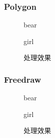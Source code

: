 \documentclass[14pt]{scrartcl} %
\begin{document}
	\pagebreak
	\subsubsection{Polygon}
	
	\begin{figure}[h] %
		\begin{minipage}[t]{0.5\linewidth}
			\centering
			\caption{bear}
		\end{minipage}%
		\begin{minipage}[t]{0.5\linewidth}
			\centering
			\caption{girl}
		\end{minipage}
	\end{figure}
	
	\begin{figure}[h] %
		\centering
		\caption{处理效果}
	\end{figure}
	
	\pagebreak
	
	\subsubsection{Freedraw}
	
	\begin{figure}[h] %
		\begin{minipage}[t]{0.5\linewidth}
			\centering
			\caption{bear}
		\end{minipage}%
		\begin{minipage}[t]{0.5\linewidth}
			\centering
			\caption{girl}
		\end{minipage}
	\end{figure}
	
	\begin{figure}[h] %
		\centering
		\caption{处理效果}
	\end{figure}
	
\end{document}
